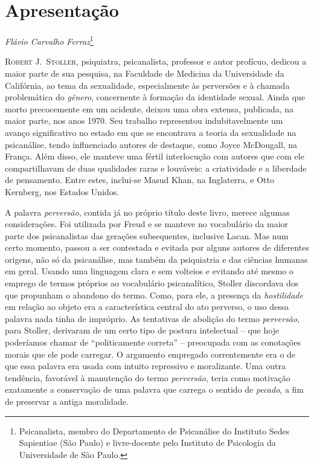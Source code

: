 \section{Apresentação}\label{apresentauxe7uxe3o}

\emph{Flávio Carvalho Ferraz}\footnote{Psicanalista, membro do
  Departamento de Psicanálise do Instituto Sedes Sapientiae (São Paulo)
  e livre-docente pelo Instituto de Psicologia da Universidade de São
  Paulo.}

\textsc{Robert J.~Stoller,} psiquiatra, psicanalista, professor e autor
profícuo, dedicou a maior parte de sua pesquisa, na Faculdade de
Medicina da Universidade da Califórnia, ao tema da sexualidade,
especialmente às perversões e à chamada problemática do \emph{gênero},
concernente à formação da identidade sexual. Ainda que morto
precocemente em um acidente, deixou uma obra extensa, publicada, na
maior parte, nos anos 1970. Seu trabalho representou indubitavelmente um
avanço significativo no estado em que se encontrava a teoria da
sexualidade na psicanálise, tendo influenciado autores de destaque, como
Joyce McDougall, na França. Além disso, ele manteve uma fértil
interlocução com autores que com ele compartilhavam de duas qualidades
raras e louváveis: a criatividade e a liberdade de pensamento. Entre
estes, inclui-se Masud Khan, na Inglaterra, e Otto Kernberg, nos Estados
Unidos.

A palavra \emph{perversão}, contida já no próprio título deste livro,
merece algumas considerações. Foi utilizada por Freud e se manteve no
vocabulário da maior parte dos psicanalistas das gerações subsequentes,
inclusive Lacan. Mas num certo momento, passou a ser contestada e
evitada por alguns autores de diferentes origens, não só da psicanálise,
mas também da psiquiatria e das ciências humanas em geral. Usando uma
linguagem clara e sem volteios e evitando até mesmo o emprego de termos
próprios ao vocabulário psicanalítico, Stoller discordava dos que
propunham o abandono do termo. Como, para ele, a presença da
\emph{hostilidade} em relação ao objeto era a característica central do
ato perverso, o uso dessa palavra nada tinha de impróprio. As tentativas
de abolição do termo \emph{perversão}, para Stoller, derivaram de um
certo tipo de postura intelectual -- que hoje poderíamos chamar de
``politicamente correta'' -- preocupada com as conotações morais que ele
pode carregar. O argumento empregado correntemente era o de que essa
palavra era usada com intuito repressivo e moralizante. Uma outra
tendência, favorável à manutenção do termo \emph{perversão}, teria como
motivação exatamente a conservação de uma palavra que carrega o sentido
de \emph{pecado}, a fim de preservar a antiga moralidade.

